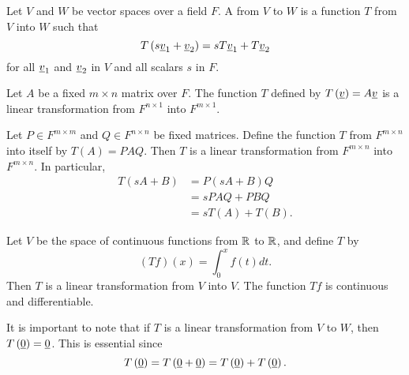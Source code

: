 \begin{definition}
Let $V$ and $W$ be vector spaces over a field $F$.
A  from $V$ to $W$ is a function $T$ from $V$ into $W$ such that
\begin{equation*}
T \left( s \underline{v}_1 + \underline{v}_2 \right)
= s T \underline{v}_1 + T \underline{v}_2
\end{equation*}
for all $\underline{v}_1$ and $\underline{v}_2$ in $V$ and all scalars $s$ in $F$.
\end{definition}

\begin{example}
Let $A$ be a fixed $m \times n$ matrix over $F$.
The function $T$ defined by $T \left( \underline{v} \right) = A \underline{v}$ is a linear transformation from $F^{n \times 1}$ into $F^{m \times 1}$.
\end{example}

\begin{example}
Let $P \in F^{m \times m}$ and $Q \in F^{n \times n}$ be fixed matrices.
Define the function $T$ from $F^{m \times n}$ into itself by $T(A) = P A Q$.
Then $T$ is a linear transformation from $F^{m \times n}$ into $F^{m \times n}$.
In particular,
\begin{equation*}
\begin{split}
T \left( s A + B \right)
&= P \left( s A + B \right) Q \\
&= s P A Q + P B Q \\
&= s T \left( A \right) + T \left( B \right) .
\end{split}
\end{equation*}
\end{example}

\begin{example}
Let $V$ be the space of continuous functions from $\mathbb{R}$ to $\mathbb{R}$, and define $T$ by
\begin{equation*}
(Tf)(x) = \int_{0}^x f(t) dt .
\end{equation*}
Then $T$ is a linear transformation from $V$ into $V$.
The function $Tf$ is continuous and differentiable.
\end{example}

It is important to note that if $T$ is a linear transformation from $V$ to $W$, then $T \left( \underline{0} \right) = \underline{0}$.
This is essential since
\begin{equation*}
T \left( \underline{0} \right)
= T \left( \underline{0} + \underline{0} \right)
= T \left( \underline{0} \right) + T \left( \underline{0} \right) .
\end{equation*}


